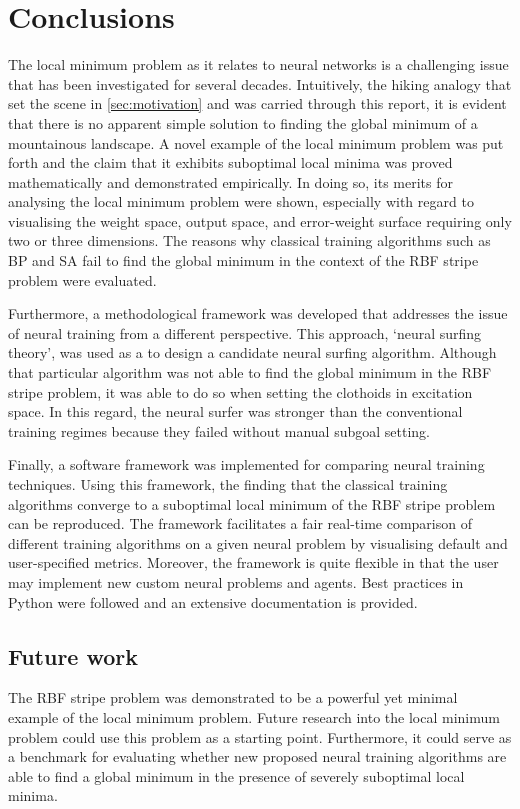 \chapter{Conclusions}
The local minimum problem as it relates to neural networks is a challenging issue that has been investigated for several decades.
Intuitively, the hiking analogy that set the scene in \ref{sec:motivation} and was carried through this report, it is evident that there is no apparent simple solution to finding the global minimum of a mountainous landscape.
A novel example of the local minimum problem was put forth and the claim that it exhibits suboptimal local minima was proved mathematically and demonstrated empirically.
In doing so, its merits for analysing the local minimum problem were shown, especially with regard to visualising the weight space, output space, and error-weight surface requiring only two or three dimensions.
The reasons why classical training algorithms such as BP and SA fail to find the global minimum in the context of the RBF stripe problem were evaluated.

Furthermore, a methodological framework was developed that addresses the issue of neural training from a different perspective.
This approach, `neural surfing theory', was used as a to design a candidate neural surfing algorithm.
Although that particular algorithm was not able to find the global minimum in the RBF stripe problem, it was able to do so when setting the clothoids in excitation space.
In this regard, the neural surfer was stronger than the conventional training regimes because they failed without manual subgoal setting.

Finally, a software framework was implemented for comparing neural training techniques.
Using this framework, the finding that the classical training algorithms converge to a suboptimal local minimum of the RBF stripe problem can be reproduced.
The framework facilitates a fair real-time comparison of different training algorithms on a given neural problem by visualising default and user-specified metrics.
Moreover, the framework is quite flexible in that the user may implement new custom neural problems and agents.
Best practices in Python were followed and an extensive documentation is provided.

\section{Future work}
\label{sec:future_work}
The RBF stripe problem was demonstrated to be a powerful yet minimal example of the local minimum problem. 
Future research into the local minimum problem could use this problem as a starting point.
Furthermore, it could serve as a benchmark for evaluating whether new proposed neural training algorithms are able to find a global minimum in the presence of severely suboptimal local minima.


